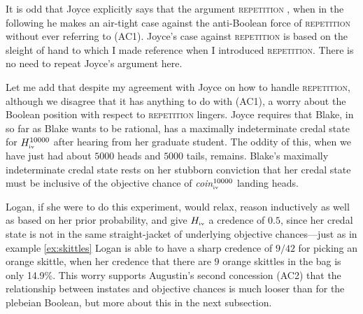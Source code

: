 \documentclass[12pt]{article}
\begin{document}
It is odd that Joyce explicitly says that the argument
\textsc{repetition}  , when in the
following he makes an air-tight case against the anti-Boolean force of
\textsc{repetition} without ever referring to (AC1). Joyce's case
against \textsc{repetition} is based on the sleight of hand to which I
made reference when I introduced \textsc{repetition}. There is no need
to repeat Joyce's argument here.

Let me add that despite my agreement with Joyce on how to handle
\textsc{repetition}, although we disagree that it has anything to do
with (AC1), a worry about the Boolean position with respect to
\textsc{repetition} lingers. Joyce requires that Blake, in so far as
Blake wants to be rational, has a maximally indeterminate credal state
for $H^{10000}_{\mbox{\tiny{iv}}}$ after hearing from her graduate
student. The oddity of this, when we have just had about $5000$ heads
and $5000$ tails, remains. Blake's maximally indeterminate credal
state rests on her stubborn conviction that her credal state must be
inclusive of the objective chance of
\textit{coin}$^{10000}_{\mbox{\tiny{iv}}}$ landing heads.

Logan, if she were to do this experiment, would relax, reason
inductively as well as based on her prior probability, and give
$H_{\mbox{\tiny{iv}}}$ a credence of $0.5$, since her credal state is
not in the same straight-jacket of underlying objective chances---just
as in example \ref{ex:skittles} Logan is able to have a sharp credence
of $9/42$ for picking an orange skittle, when her credence that there
are $9$ orange skittles in the bag is only 14.9\%. This worry supports
Augustin's second concession (AC2) that the relationship between
instates and objective chances is much looser than for the plebeian
Boolean, but more about this in the next subsection.
\end{document}
